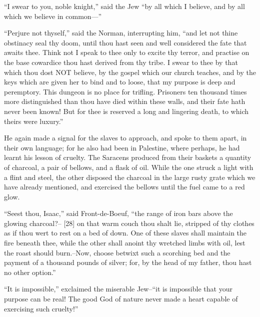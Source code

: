 ``I swear to you, noble knight,'' said the Jew ``by all which I believe,
and by all which we believe in common---''

``Perjure not thyself,'' said the Norman, interrupting him, ``and let
not thine obstinacy seal thy doom, until thou hast seen and well
considered the fate that awaits thee. Think not I speak to thee only to
excite thy terror, and practise on the base cowardice thou hast derived
from thy tribe. I swear to thee by that which thou dost NOT believe, by
the gospel which our church teaches, and by the keys which are given her
to bind and to loose, that my purpose is deep and peremptory. This
dungeon is no place for trifling. Prisoners ten thousand times more
distinguished than thou have died within these walls, and their fate
hath never been known! But for thee is reserved a long and lingering
death, to which theirs were luxury.''

He again made a signal for the slaves to approach, and spoke to them
apart, in their own language; for he also had been in Palestine, where
perhaps, he had learnt his lesson of cruelty. The Saracens produced from
their baskets a quantity of charcoal, a pair of bellows, and a flask of
oil. While the one struck a light with a flint and steel, the other
disposed the charcoal in the large rusty grate which we have already
mentioned, and exercised the bellows until the fuel came to a red glow.

``Seest thou, Isaac,'' said Front-de-Boeuf, ``the range of iron bars
above the glowing charcoal?-- {[}28{]} on that warm couch thou shalt
lie, stripped of thy clothes as if thou wert to rest on a bed of down.
One of these slaves shall maintain the fire beneath thee, while the
other shall anoint thy wretched limbs with oil, lest the roast should
burn.--Now, choose betwixt such a scorching bed and the payment of a
thousand pounds of silver; for, by the head of my father, thou hast no
other option.''

``It is impossible,'' exclaimed the miserable Jew--``it is impossible
that your purpose can be real! The good God of nature never made a heart
capable of exercising such cruelty!''

